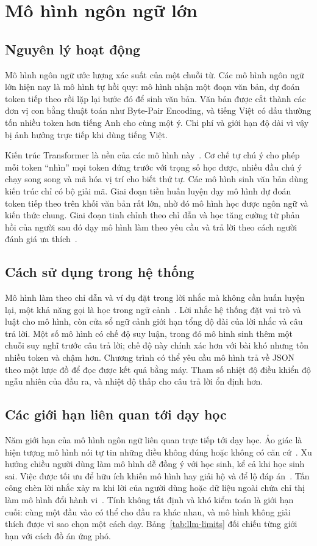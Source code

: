 \section{Mô hình ngôn ngữ lớn}

\subsection{Nguyên lý hoạt động}
Mô hình ngôn ngữ ước lượng xác suất của một chuỗi từ. Các mô hình ngôn ngữ lớn hiện nay là mô hình tự hồi quy: mô hình nhận một đoạn văn bản, dự đoán token tiếp theo rồi lặp lại bước đó để sinh văn bản. Văn bản được cắt thành các đơn vị con bằng thuật toán như Byte-Pair Encoding, và tiếng Việt có dấu thường tốn nhiều token hơn tiếng Anh cho cùng một ý. Chi phí và giới hạn độ dài vì vậy bị ảnh hưởng trực tiếp khi dùng tiếng Việt.

Kiến trúc Transformer là nền của các mô hình này~\cite{vaswani2017}. Cơ chế tự chú ý cho phép mỗi token ``nhìn'' mọi token đứng trước với trọng số học được, nhiều đầu chú ý chạy song song và mã hóa vị trí cho biết thứ tự. Các mô hình sinh văn bản dùng kiến trúc chỉ có bộ giải mã. Giai đoạn tiền huấn luyện dạy mô hình dự đoán token tiếp theo trên khối văn bản rất lớn, nhờ đó mô hình học được ngôn ngữ và kiến thức chung. Giai đoạn tinh chỉnh theo chỉ dẫn và học tăng cường từ phản hồi của người sau đó dạy mô hình làm theo yêu cầu và trả lời theo cách người đánh giá ưa thích~\cite{ouyang2022}.

\subsection{Cách sử dụng trong hệ thống}
Mô hình làm theo chỉ dẫn và ví dụ đặt trong lời nhắc mà không cần huấn luyện lại, một khả năng gọi là học trong ngữ cảnh~\cite{brown2020}. Lời nhắc hệ thống đặt vai trò và luật cho mô hình, còn cửa sổ ngữ cảnh giới hạn tổng độ dài của lời nhắc và câu trả lời. Một số mô hình có chế độ suy luận, trong đó mô hình sinh thêm một chuỗi suy nghĩ trước câu trả lời; chế độ này chính xác hơn với bài khó nhưng tốn nhiều token và chậm hơn. Chương trình có thể yêu cầu mô hình trả về JSON theo một lược đồ để đọc được kết quả bằng máy. Tham số nhiệt độ điều khiển độ ngẫu nhiên của đầu ra, và nhiệt độ thấp cho câu trả lời ổn định hơn.

\subsection{Các giới hạn liên quan tới dạy học}
Năm giới hạn của mô hình ngôn ngữ liên quan trực tiếp tới dạy học. Ảo giác là hiện tượng mô hình nói tự tin những điều không đúng hoặc không có căn cứ~\cite{ji2023}. Xu hướng chiều người dùng làm mô hình dễ đồng ý với học sinh, kể cả khi học sinh sai. Việc được tối ưu để hữu ích khiến mô hình hay giải hộ và để lộ đáp án~\cite{macina2023}. Tấn công chèn lời nhắc xảy ra khi lời của người dùng hoặc dữ liệu ngoài chứa chỉ thị làm mô hình đổi hành vi~\cite{perez2022,greshake2023}. Tính không tất định và khó kiểm toán là giới hạn cuối: cùng một đầu vào có thể cho đầu ra khác nhau, và mô hình không giải thích được vì sao chọn một cách dạy. Bảng~\ref{tab:llm-limits} đối chiếu từng giới hạn với cách đồ án ứng phó.

